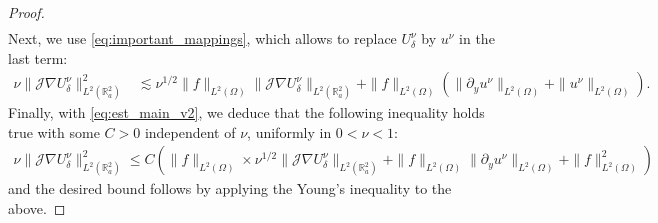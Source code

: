 \documentclass[10pt,a4paper]{amsart}
\begin{document}
\begin{proof}
\begin{align*}
\end{align*}
Next, we use \eqref{eq:important_mappings}, which allows to replace $U^{\nu}_{\delta}$ by $u^{\nu}$ in the last term:
\begin{align*}
	\nu\|\mathcal{J}\nabla U^{\nu}_{\delta}\|^2_{L^2(\mathbb{R}^2_a)}&\lesssim \nu^{1/2}\|f\|_{L^2(\Omega)}\|\mathcal{J}\nabla U^{\nu}_{\delta}\|_{L^2(\mathbb{R}^2_a)}+\|f\|_{L^2(\Omega)}\left(\|\partial_y u^{\nu}\|_{L^2(\Omega)}+\|u^{\nu}\|_{L^2(\Omega)}\right).
\end{align*}
Finally, with \eqref{eq:est_main_v2}, we deduce that the following inequality holds true with some $C>0$ independent of $\nu$, uniformly in $0<\nu<1$:
\begin{align*}
	\nu\|\mathcal{J}\nabla U^{\nu}_{\delta}\|^2_{L^2(\mathbb{R}^2_a)}\leq C( \|f\|_{L^2(\Omega)}\times \nu^{1/2}\|\mathcal{J}\nabla U^{\nu}_{\delta}\|_{L^2(\mathbb{R}^2_a)}+\|f\|_{L^2(\Omega)}\|\partial_y u^{\nu}\|_{L^2(\Omega)}+\|f\|^2_{L^2(\Omega)})
\end{align*}
and the desired bound follows by applying the Young's inequality to the above. 
\end{proof}
\end{document}
